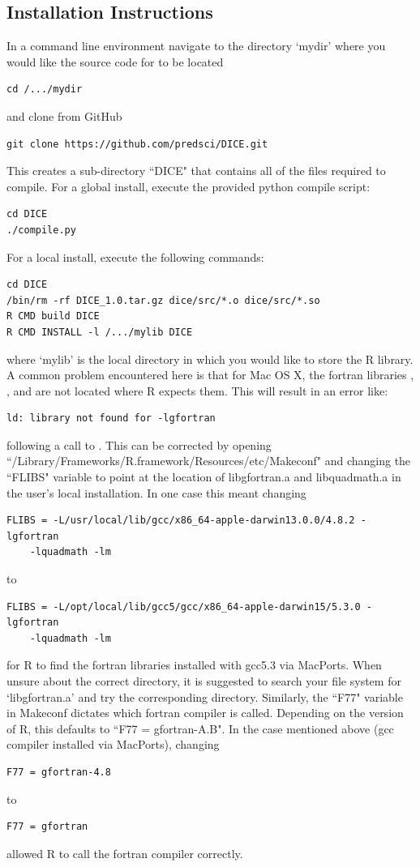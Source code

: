 \documentclass[a4paper]{article}
\begin{document}
\subsection{Installation Instructions}
\label{sssec:Install}
In a command line environment navigate to the directory `mydir' where you would like the source code for  to be located
\begin{verbatim}
cd /.../mydir
\end{verbatim}
and clone from GitHub
\begin{verbatim}
git clone https://github.com/predsci/DICE.git
\end{verbatim}
This creates a sub-directory ``DICE" that contains all of the files required to compile.  For a global install, execute the provided python compile script:
\begin{verbatim}
cd DICE
./compile.py
\end{verbatim}
For a local install, execute the following commands:
\begin{verbatim}
cd DICE
/bin/rm -rf DICE_1.0.tar.gz dice/src/*.o dice/src/*.so
R CMD build DICE
R CMD INSTALL -l /.../mylib DICE
\end{verbatim}
where `mylib' is the local directory in which you would like to store the R library.  A common problem encountered here is that for Mac OS X, the fortran libraries , , and  are not located where R expects them.  This will result in an error like:
\begin{verbatim}
ld: library not found for -lgfortran
\end{verbatim}
following a call to .  This can be corrected by opening ``/Library/Frameworks/R.framework/Resources/etc/Makeconf" and changing the ``FLIBS" variable to point at the location of libgfortran.a and libquadmath.a in the user's local installation.  In one case this meant changing
\begin{verbatim}
FLIBS = -L/usr/local/lib/gcc/x86_64-apple-darwin13.0.0/4.8.2 -lgfortran
    -lquadmath -lm
\end{verbatim}
to
\begin{verbatim}
FLIBS = -L/opt/local/lib/gcc5/gcc/x86_64-apple-darwin15/5.3.0 -lgfortran
    -lquadmath -lm
\end{verbatim}
for R to find the fortran libraries installed with gcc5.3 via MacPorts.  When unsure about the correct directory, it is suggested to search your file system for `libgfortran.a' and try the corresponding directory.  Similarly, the ``F77" variable in Makeconf dictates which fortran compiler is called.  Depending on the version of R, this defaults to ``F77 = gfortran-A.B".  In the case mentioned above (gcc compiler installed via MacPorts), changing
\begin{verbatim}
F77 = gfortran-4.8
\end{verbatim}
to
\begin{verbatim}
F77 = gfortran
\end{verbatim}
allowed R to call the fortran compiler correctly.
\end{document}
